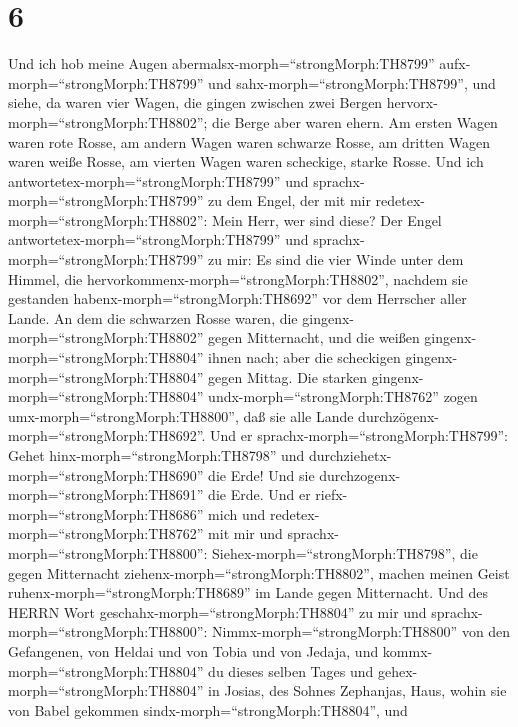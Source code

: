 \hypertarget{section-5}{%
\section{6}\label{section-5}}

 Und ich hob meine Augen
abermalsx-morph=``strongMorph:TH8799'' aufx-morph=``strongMorph:TH8799''
und sahx-morph=``strongMorph:TH8799'', und siehe, da waren vier Wagen,
die gingen zwischen zwei Bergen hervorx-morph=``strongMorph:TH8802'';
die Berge aber waren ehern.  Am ersten Wagen waren rote
Rosse, am andern Wagen waren schwarze Rosse,  am dritten
Wagen waren weiße Rosse, am vierten Wagen waren scheckige, starke Rosse.
 Und ich antwortetex-morph=``strongMorph:TH8799'' und
sprachx-morph=``strongMorph:TH8799'' zu dem Engel, der mit mir
redetex-morph=``strongMorph:TH8802'': Mein Herr, wer sind diese?
 Der Engel antwortetex-morph=``strongMorph:TH8799'' und
sprachx-morph=``strongMorph:TH8799'' zu mir: Es sind die vier Winde
unter dem Himmel, die hervorkommenx-morph=``strongMorph:TH8802'',
nachdem sie gestanden habenx-morph=``strongMorph:TH8692'' vor dem
Herrscher aller Lande.  An dem die schwarzen Rosse waren,
die gingenx-morph=``strongMorph:TH8802'' gegen Mitternacht, und die
weißen gingenx-morph=``strongMorph:TH8804'' ihnen nach; aber die
scheckigen gingenx-morph=``strongMorph:TH8804'' gegen Mittag.
 Die starken gingenx-morph=``strongMorph:TH8804''
undx-morph=``strongMorph:TH8762'' zogen
umx-morph=``strongMorph:TH8800'', daß sie alle Lande
durchzögenx-morph=``strongMorph:TH8692''. Und er
sprachx-morph=``strongMorph:TH8799'': Gehet
hinx-morph=``strongMorph:TH8798'' und
durchziehetx-morph=``strongMorph:TH8690'' die Erde! Und sie
durchzogenx-morph=``strongMorph:TH8691'' die Erde.  Und er
riefx-morph=``strongMorph:TH8686'' mich und
redetex-morph=``strongMorph:TH8762'' mit mir und
sprachx-morph=``strongMorph:TH8800'':
Siehex-morph=``strongMorph:TH8798'', die gegen Mitternacht
ziehenx-morph=``strongMorph:TH8802'', machen meinen Geist
ruhenx-morph=``strongMorph:TH8689'' im Lande gegen Mitternacht.
 Und des HERRN Wort geschahx-morph=``strongMorph:TH8804'' zu
mir und sprachx-morph=``strongMorph:TH8800'': 
Nimmx-morph=``strongMorph:TH8800'' von den Gefangenen, von Heldai und
von Tobia und von Jedaja, und kommx-morph=``strongMorph:TH8804'' du
dieses selben Tages und gehex-morph=``strongMorph:TH8804'' in Josias,
des Sohnes Zephanjas, Haus, wohin sie von Babel gekommen
sindx-morph=``strongMorph:TH8804'',  und
